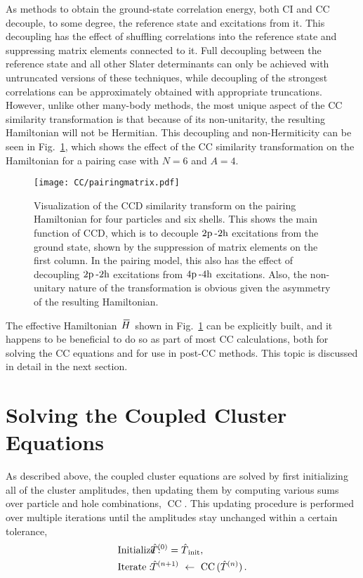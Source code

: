 \documentclass[thesis.tex]{subfiles}
\begin{document}
As methods to obtain the ground-state correlation energy, both CI and CC decouple, to some degree, the reference state and excitations from it.  This decoupling has the effect of shuffling correlations into the reference state and suppressing matrix elements connected to it.  Full decoupling between the reference state and all other Slater determinants can only be achieved with untruncated versions of these techniques, while decoupling of the strongest correlations can be approximately obtained with appropriate truncations.  However, unlike other many-body methods, the most unique aspect of the CC similarity transformation is that because of its non-unitarity, the resulting Hamiltonian will not be Hermitian.  This decoupling and non-Hermiticity can be seen in Fig.\ \ref{fig:pairingmatrix}, which shows the effect of the CC similarity transformation on the Hamiltonian for a pairing case with $N = 6$ and $A = 4$.
\begin{figure}[h]
  \centering
  \texttt{[image: CC/pairingmatrix.pdf]}
  \caption{Visualization of the CCD similarity transform on the pairing Hamiltonian for four particles and six shells.  This shows the main function of CCD, which is to decouple $2\mathrm{p}\hspace{2pt}\text{-}2\mathrm{h}$ excitations from the ground state, shown by the suppression of matrix elements on the first column. In the pairing model, this also has the effect of decoupling $2\mathrm{p}\hspace{2pt}\text{-}2\mathrm{h}$ excitations from $4\mathrm{p}\hspace{2pt}\text{-}4\mathrm{h}$ excitations.  Also, the non-unitary nature of the transformation is obvious given the asymmetry of the resulting Hamiltonian.}
  \label{fig:pairingmatrix}
\end{figure}
The effective Hamiltonian $\EHam$ shown in Fig.\ \ref{fig:pairingmatrix} can be explicitly built, and it happens to be beneficial to do so as part of most CC calculations, both for solving the CC equations and for use in post-CC methods.  This topic is discussed in detail in the next section.




\section{Solving the Coupled Cluster Equations} \label{section:solvingcc}

As described above, the coupled cluster equations are solved by first initializing all of the cluster amplitudes, then updating them by computing various sums over particle and hole combinations, $\text{CC}\mathop{(\Top)}$.  This updating procedure is performed over multiple iterations until the amplitudes stay unchanged within a certain tolerance,
\begin{align} \label{eq:cc_algorithm}
  &\text{Initialize}:&    \hspace{-20pt}&\Top^{\mathop{(0)}} = \Top_{\text{init}}, \notag \\
  &\text{Iterate}:&       \hspace{-20pt}&\Top^{\mathop{(n+1)}}\ \leftarrow\ \text{CC}\mathop{(\Top^{\mathop{(n)}})}.
\end{align}
\end{document}
